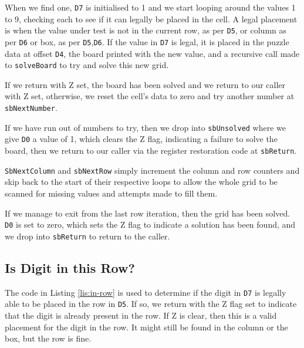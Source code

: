 When we find one, \texttt{D7} is initialised to 1 and we start looping
around the values 1 to 9, checking each to see if it can legally be
placed in the cell. A legal placement is when the value under test
is not in the current row, as per \texttt{D5}, or column as per \texttt{D6}
or box, as per \texttt{D5},\texttt{D6}. If the value in \texttt{D7}
is legal, it is placed in the puzzle data at offset \texttt{D4}, the
board printed with the new value, and a recursive call made to \texttt{solveBoard}
to try and solve this new grid.

If we return with Z set, the board has been solved and we return to
our caller with Z set, otherwise, we reset the cell's data to zero
and try another number at \texttt{sbNextNumber}.



If we have run out of numbers to try, then we drop into \texttt{sbUnsolved}
where we give \texttt{D0} a value of 1, which clears the Z flag, indicating
a failure to solve the board, then we return to our caller via the
register restoration code at \texttt{sbReturn}.

\texttt{SbNextColumn} and \texttt{sbNextRow} simply increment the
column and row counters and skip back to the start of their respective
loops to allow the whole grid to be scanned for missing values and
attempts made to fill them.

If we manage to exit from the last row iteration, then the grid has
been solved. \texttt{D0} is set to zero, which sets the Z flag to
indicate a solution has been found, and we drop into \texttt{sbReturn}
to return to the caller.

\subsection{Is Digit in this Row?}

The code in Listing \ref{lis:in-row} is used to determine if the
digit in \texttt{D7} is legally able to be placed in the row in \texttt{D5}.
If so, we return with the Z flag set to indicate that the digit is
already present in the row. If Z is clear, then this is a valid placement
for the digit in the row. It might still be found in the column or
the box, but the row is fine.



